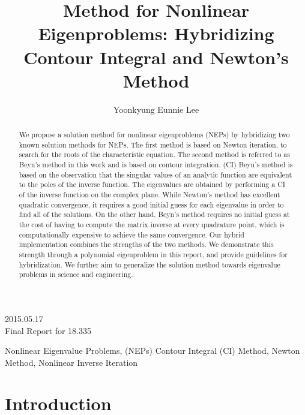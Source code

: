 \documentclass[final,leqno,onefignum,onetabnum]{siamltex1213}
\title{Method for Nonlinear Eigenproblems: Hybridizing Contour Integral and Newton's Method}
\author{Yoonkyung Eunnie Lee \footnotemark[2]}
\begin{document}
\maketitle
\begin{flushright}
2015.05.17\\
Final Report for 18.335 \\
\end{flushright}

\begin{abstract}
We propose a solution method for nonlinear eigenproblems (NEPs) by hybridizing two known solution methods for NEPs. The first method is based on Newton iteration, to search for the roots of the characteristic equation. The second method is referred to as Beyn's method in this work and is based on contour integration. (CI) Beyn's method is based on the observation that the singular values of an analytic function are equivalent to the poles of the inverse function. The eigenvalues are obtained by performing a CI of the inverse function on the complex plane.  
While Newton's method has excellent quadratic convergence, it requires a good initial guess for each eigenvalue in order to find all of the solutions. On the other hand, Beyn's method requires no initial guess at the cost of having to compute the matrix inverse at every quadrature point, which is computationally expensive to achieve the same convergence. Our hybrid implementation combines the strengths of the two methods. We demonstrate this strength through a polynomial eigenproblem in this report, and provide guidelines for hybridization. We further aim to generalize the solution method towards eigenvalue problems in science and engineering. 

\end{abstract}
\begin{keywords} Nonlinear Eigenvalue Problems, (NEPs) Contour Integral (CI) Method, Newton Method, Nonlinear Inverse Iteration \end{keywords}
\section{Introduction} 
\end{document}
